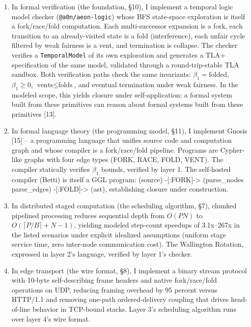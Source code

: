 \documentclass[
  11pt,
]{article}
\begin{document}
\begin{enumerate}
\def\labelenumi{\arabic{enumi}.}
\item
  In formal verification (the foundation, §10), I implement a temporal
  logic model checker (\texttt{@a0n/aeon-logic}) whose BFS
  state-space exploration is itself a fork/race/fold computation. Each
  multi-successor expansion is a fork, each transition to an
  already-visited state is a fold (interference), each unfair cycle
  filtered by weak fairness is a vent, and termination is collapse. The
  checker verifies a \texttt{TemporalModel} of its own exploration and
  generates a TLA+ specification of the same model, validated through a
  round-trip-stable TLA sandbox. Both verification paths check the same
  invariants: \(\beta_1 = \text{folded}\), \(\beta_1 \geq 0\),
  \(\text{vents} \leq \text{folds}\), and eventual termination under
  weak fairness. In the modeled scope, this yields closure under
  self-application: a formal system built from these primitives can
  reason about formal systems built from these primitives {[}13{]}.
\item
  In formal language theory (the programming model, §11), I implement
  Gnosis {[}15{]} -- a programming language that unifies source code and
  computation graph and whose compiler is a fork/race/fold pipeline.
  Programs are Cypher-like graphs with four edge types (FORK, RACE,
  FOLD, VENT). The compiler statically verifies \(\beta_1\) bounds,
  verified by layer 1. The self-hosted compiler (Betti) is itself a GGL
  program: (source) -{[}:FORK{]}-\textgreater{} (parse\_nodes
  parse\_edges) -{[}:FOLD{]}-\textgreater{} (ast), establishing closure
  under construction.
\item
  In distributed staged computation (the scheduling algorithm, §7),
  chunked pipelined processing reduces sequential depth from \(O(PN)\)
  to \(O(\lceil P/B \rceil + N - 1)\), yielding modeled step-count
  speedups of 3.1x--267x in the listed scenarios under explicit
  idealized assumptions (uniform stage service time, zero inter-node
  communication cost). The Wallington Rotation, expressed in layer 2's
  language, verified by layer 1's checker.
\item
  In edge transport (the wire format, §8), I implement a binary stream
  protocol with 10-byte self-describing frame headers and native
  fork/race/fold operations on UDP, reducing framing overhead by 95
  percent versus HTTP/1.1 and removing one-path ordered-delivery
  coupling that drives head-of-line behavior in TCP-bound stacks. Layer
  3's scheduling algorithm runs over layer 4's wire format.

\end{enumerate}
\end{document}
